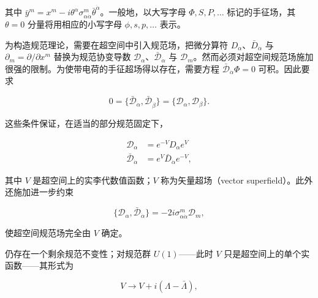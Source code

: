 其中 $\bar y^m=x^m-i\theta^\alpha\sigma^m_{\alpha\dot\alpha}\bar\theta^{\dot\alpha}$。一般地，以大写字母 $\Phi,S,P,\dots$ 标记的手征场，其 $\theta=0$ 分量将用相应的小写字母 $\phi,s,p,\dots$ 表示。

为构造规范理论，需要在超空间中引入规范场，把微分算符 $D_\alpha$、$\bar D_{\dot\alpha}$ 与 $\partial_m=\partial/\partial x^m$ 替换为规范协变导数 $\mathcal D_\alpha$、$\bar{\mathcal D}_{\dot\alpha}$ 与 $\mathcal D_m$。然而必须对超空间规范场施加很强的限制。为使带电荷的手征超场得以存在，需要方程 $\bar{\mathcal D}_{\dot\alpha}\Phi=0$ 可积。因此要求


\begin{equation}
0=\{\bar{\mathcal D}_{\dot\alpha},\bar{\mathcal D}_{\dot\beta}\}=\{\mathcal D_\alpha,\mathcal D_\beta\}.
\tag{2.6}
\end{equation}

这些条件保证，在适当的部分规范固定下，

\begin{equation}
\begin{aligned}
\mathcal D_\alpha &= e^{-V}D_\alpha e^{V}\\
\bar{\mathcal D}_{\dot\alpha} &= e^{V}\bar D_{\dot\alpha}e^{-V},
\end{aligned}
\tag{2.7}
\end{equation}

其中 $V$ 是超空间上的实李代数值函数；$V$ 称为矢量超场（vector superfield）。此外还施加进一步约束

\begin{equation}
\{\mathcal D_\alpha,\bar{\mathcal D}_{\dot\alpha}\}=-2i\sigma^m_{\alpha\dot\alpha}\mathcal D_m,
\tag{2.8}
\end{equation}

使超空间规范场完全由 $V$ 确定。

仍存在一个剩余规范不变性；对规范群 $U(1)$——此时 $V$ 只是超空间上的单个实函数——其形式为

\begin{equation}
V\to V+i(\Lambda-\bar\Lambda),
\tag{2.9}
\end{equation}

